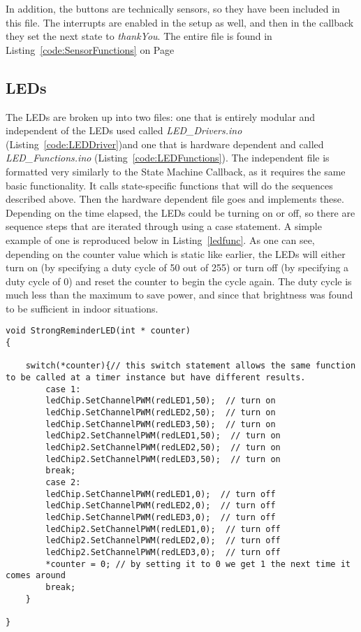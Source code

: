 \documentclass{article}
\begin{document}
In addition, the buttons are technically sensors, so they have been included in this file. The interrupts are enabled in the setup as well, and then in the callback they set the next state to \textsl{thankYou}. The entire file is found in Listing~\ref{code:SensorFunctions} on Page~\pageref{code:SensorFunctions}

\subsection{LEDs}
The LEDs are broken up into two files: one that is entirely modular and independent of the LEDs used called \textit{LED\_Drivers.ino} (Listing~\ref{code:LEDDriver})and one that is hardware dependent and called \textit{LED\_Functions.ino} (Listing~\ref{code:LEDFunctions}). The independent file is formatted very similarly to the State Machine Callback, as it requires the same basic functionality. It calls state-specific functions that will do the sequences described above. Then the hardware dependent file goes and implements these. Depending on the time elapsed, the LEDs could be turning on or off, so there are sequence steps that are iterated through using a case statement. A simple example of one is reproduced below in Listing~\ref{ledfunc}. As one can see, depending on the counter value which is static like earlier, the LEDs will either turn on (by specifying a duty cycle of 50 out of 255) or turn off (by specifying a duty cycle of 0) and reset the counter to begin the cycle again. The duty cycle is much less than the maximum to save power, and since that brightness was found to be sufficient in indoor situations. 

\begin{lstlisting}[caption={The Strong Reminder LED function}, label={code:ledfunc}]
void StrongReminderLED(int * counter)
{

	switch(*counter){// this switch statement allows the same function to be called at a timer instance but have different results. 
		case 1: 
		ledChip.SetChannelPWM(redLED1,50);  // turn on
		ledChip.SetChannelPWM(redLED2,50);  // turn on
		ledChip.SetChannelPWM(redLED3,50);  // turn on
		ledChip2.SetChannelPWM(redLED1,50);  // turn on
		ledChip2.SetChannelPWM(redLED2,50);  // turn on
		ledChip2.SetChannelPWM(redLED3,50);  // turn on
		break;
		case 2: 
		ledChip.SetChannelPWM(redLED1,0);  // turn off
		ledChip.SetChannelPWM(redLED2,0);  // turn off
		ledChip.SetChannelPWM(redLED3,0);  // turn off
		ledChip2.SetChannelPWM(redLED1,0);  // turn off
		ledChip2.SetChannelPWM(redLED2,0);  // turn off
		ledChip2.SetChannelPWM(redLED3,0);  // turn off
		*counter = 0; // by setting it to 0 we get 1 the next time it comes around 
		break;
	}

}

\end{lstlisting}
\end{document}
